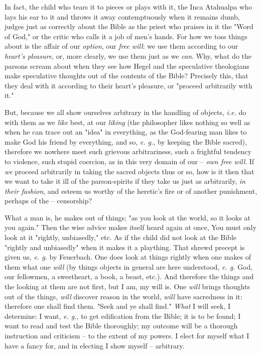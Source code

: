 \documentclass[a4paper]{book}
\begin{document}
In fact, the child who tears it to pieces or plays with it, the Inca Atahualpa 
who lays his ear to it and throws it away contemptuously when it remains dumb, 
judges just as correctly about the Bible as the priest who praises in it the 
"{}Word of God,"{} or the critic who calls it a job of men's hands. For how we 
toss things about is the affair of our \textit{option}, our \textit{free 
will}: we use them according to our \textit{heart's pleasure}, or, more 
clearly, we use them just as we \textit{can}. Why, what do the parsons scream 
about when they see how Hegel and the speculative theologians make speculative 
thoughts out of the contents of the Bible? Precisely this, that they deal with 
it according to their heart's pleasure, or "{}proceed arbitrarily with it."{}

But, because we all show ourselves arbitrary in the handling of objects, 
\textit{i.e.} do with them as we \textit{like} best, at our \textit{liking} 
(the philosopher likes nothing so well as when he can trace out an "{}idea"{} 
in everything, as the God-fearing man likes to make God his friend by 
everything, and so, \textit{e. g.}, by keeping the Bible sacred), therefore we 
nowhere meet such grievous arbitrariness, such a frightful tendency to 
violence, such stupid coercion, as in this very domain of our -- \textit{own 
free will}. If \textit{we} proceed arbitrarily in taking the sacred objects 
thus or so, how is it then that we want to take it ill of the parson-spirits 
if they take us just as arbitrarily, \textit{in their fashion}, and esteem us 
worthy of the heretic's fire or of another punishment, perhaps of the -- 
censorship?

What a man is, he makes out of things; "{}as you look at the world, so it 
looks at you again."{} Then the wise advice makes itself heard again at once, 
You must only look at it "{}rightly, unbiasedly,"{} etc. As if the child did 
not look at the Bible "{}rightly and unbiasedly"{} when it makes it a 
plaything. That shrewd precept is given us, \textit{e. g.} by Feuerbach. One 
does look at things rightly when one makes of them what one \textit{will} (by 
things objects in general are here understood, \textit{e. g.} God, our 
fellowmen, a sweetheart, a book, a beast, etc.). And therefore the things and 
the looking at them are not first, but I am, my will is. One \textit{will} 
brings thoughts out of the things, \textit{will} discover reason in the world, 
\textit{will} have sacredness in it: therefore one shall find them. "{}Seek 
and ye shall find."{} \textit{What} I will seek, I determine: I want, 
\textit{e. g.}, to get edification from the Bible; it is to be found; I want 
to read and test the Bible thoroughly; my outcome will be a thorough 
instruction and criticism -- to the extent of my powers. I elect for myself 
what I have a fancy for, and in electing I show myself -- arbitrary.
\end{document}
